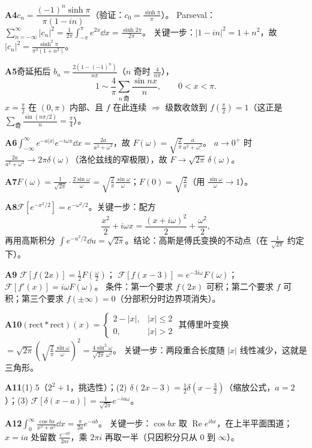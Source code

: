 \documentclass[11pt]{ctexart}
\begin{document}
\textbf{A4}\quad $c_n=\dfrac{(-1)^n\sinh\pi}{\pi(1-in)}$（验证：$c_0=\frac{\sinh\pi}{\pi}$）。
Parseval：$\displaystyle\sum_{n=-\infty}^{\infty}|c_n|^2=\frac{1}{2\pi}\int_{-\pi}^{\pi}e^{2x}\dd x=\frac{\sinh 2\pi}{2\pi}$。
关键一步：$|1-in|^2=1+n^2$，故 $|c_n|^2=\frac{\sinh^2\pi}{\pi^2(1+n^2)}$。

\textbf{A5}\quad 奇延拓后 $b_n=\frac{2(1-(-1)^n)}{n\pi}$（$n$ 奇时 $\frac{4}{n\pi}$），
\[ 1\sim\frac{4}{\pi}\sum_{n\ \text{奇}}\frac{\sin nx}{n},\qquad 0<x<\pi . \]
$x=\frac{\pi}{2}$ 在 $(0,\pi)$ 内部、且 $f$ 在此连续 $\Rightarrow$ 级数收敛到 $f\left(\frac{\pi}{2}\right)=1$（这正是 $\sum_{\text{奇}}\frac{\sin(n\pi/2)}{n}=\frac{\pi}{4}$）。

\textbf{A6}\quad $\displaystyle\int_{-\infty}^{\infty}e^{-a|x|}e^{-i\omega x}\dd x=\frac{2a}{a^2+\omega^2}$，故 $F(\omega)=\sqrt{\frac{2}{\pi}}\frac{a}{a^2+\omega^2}$。
$a\to0^{+}$ 时 $\frac{2a}{a^2+\omega^2}\to2\pi\delta(\omega)$（洛伦兹线的窄极限），故 $F\to\sqrt{2\pi}\,\delta(\omega)$。

\textbf{A7}\quad $F(\omega)=\frac{1}{\sqrt{2\pi}}\cdot\frac{2\sin\omega}{\omega}=\sqrt{\frac{2}{\pi}}\frac{\sin\omega}{\omega}$；$F(0)=\sqrt{\frac{2}{\pi}}$（用 $\frac{\sin\omega}{\omega}\to1$）。

\textbf{A8}\quad $\mathcal F[e^{-x^2/2}]=e^{-\omega^2/2}$。关键一步：配方
\[ \frac{x^2}{2}+i\omega x=\frac{(x+i\omega)^2}{2}+\frac{\omega^2}{2}, \]
再用高斯积分 $\int e^{-u^2/2}\dd u=\sqrt{2\pi}$。结论：高斯是傅氏变换的不动点（在 $\frac{1}{\sqrt{2\pi}}$ 约定下）。

\textbf{A9}\quad
$\mathcal F[f(2x)]=\frac12F\!\left(\frac{\omega}{2}\right)$；
$\mathcal F[f(x-3)]=e^{-3i\omega}F(\omega)$；
$\mathcal F[f'(x)]=i\omega F(\omega)$。
条件：第一个要求 $f(2x)$ 可积；第二个要求 $f$ 可积；第三个要求 $f(\pm\infty)=0$（分部积分时边界项消失）。

\textbf{A10}\quad $(\mathrm{rect}*\mathrm{rect})(x)=\begin{cases}2-|x|, & |x|\le 2\\ 0, & |x|>2\end{cases}$
其傅里叶变换 $=\sqrt{2\pi}\left(\sqrt{\frac{2}{\pi}}\frac{\sin\omega}{\omega}\right)^2=\frac{4\sin^2\omega}{\sqrt{2\pi}\,\omega^2}$。
关键一步：两段重合长度随 $|x|$ 线性减少，这就是三角形。

\textbf{A11}\quad (1) $5$（$2^2+1$，挑选性）；(2) $\delta(2x-3)=\frac12\delta\left(x-\frac32\right)$（缩放公式，$a=2$）；(3) $\mathcal F[\delta(x-a)]=\frac{1}{\sqrt{2\pi}}e^{-ia\omega}$。

\textbf{A12}\quad $\displaystyle\int_0^{\infty}\frac{\cos bx}{x^2+a^2}\dd x=\frac{\pi}{2a}e^{-ab}$。
关键一步：$\cos bx$ 取 $\operatorname{Re}e^{ibx}$，在上半平面围道；$x=ia$ 处留数 $\frac{e^{-ab}}{2ai}$，乘 $2\pi i$ 再取一半（只因积分只从 $0$ 到 $\infty$）。
\end{document}
